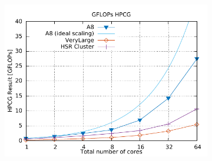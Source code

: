 \documentclass[3p,times]{elsarticle}
\begin{document}
\begin{figure}[ht]
\centering
\begin{subfigure}{.33\textwidth}
	\centering
	\includegraphics[width=\linewidth]{gplt-gflops-hpcg}
	


\end{subfigure}
\end{figure}
\end{document}
